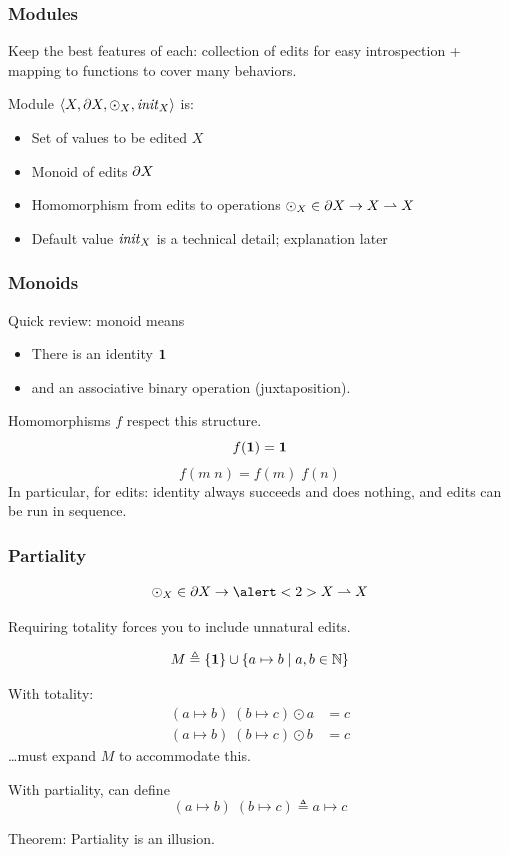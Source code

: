 \documentclass{beamer}
\begin{document}
\begin{frame}
    \frametitle{Modules}
    Keep the best features of each: collection of edits for easy
    introspection + mapping to functions to cover many behaviors.

    \vpause

    Module $\left<X,\partial X,\odot_X,\mathit{init}_X\right>$ is:
    \begin{itemize}
        \item Set of values to be edited $X$
        \item Monoid of edits $\partial X$
        \item Homomorphism from edits to operations $\odot_X \in \partial X \to X
            \rightharpoonup X$
        \item Default value $\mathit{init}_X$ is a technical detail; explanation
            later
    \end{itemize}
\end{frame}

\begin{frame}
    \frametitle{Monoids}
    Quick review: monoid means
    \begin{itemize}
        \item There is an identity $\mbox{\bf{1}}$
        \item and an associative binary operation (juxtaposition).
    \end{itemize}

    Homomorphisms $f$ respect this structure.
    \[f(\mbox{\bf{1}}) = \mbox{\bf{1}}\]
    \[f(m\;n) = f(m)\;f(n)\]
    In particular, for edits: identity always succeeds and does nothing, and
    edits can be run in sequence.
\end{frame}

\begin{frame}
    \frametitle{Partiality}
    \[\odot_X \in \DX \to \alert<2>{X \partialto X}\]

    \pause\pause

    Requiring totality forces you to include unnatural edits.

    \[M \triangleq \{\mbox{\bf{1}}\} \cup \{a \mapsto b \mid a,b \in \mathbb{N}\}\]

    With totality:
    \begin{align*}
        (a \mapsto b)\;(b \mapsto c) \odot a &= c \\
        (a \mapsto b)\;(b \mapsto c) \odot b &= c
    \end{align*}
    \ldots must expand $M$ to accommodate this.

    With partiality, can define
    \[(a \mapsto b)\;(b \mapsto c) \triangleq a \mapsto c\]

    \pause
    Theorem: Partiality is an illusion.
\end{frame}
\end{document}
